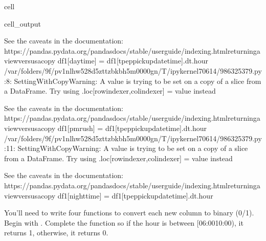 \documentclass[letterpaper,10pt,english]{sphinxmanual}
\begin{document}
\begin{sphinxuseclass}{cell}
\begin{sphinxuseclass}{cell_output}
\begin{sphinxVerbatim}[commandchars=\\\{\}]
See the caveats in the documentation: https://pandas.pydata.org/pandas\PYGZhy{}docs/stable/user\PYGZus{}guide/indexing.html\PYGZsh{}returning\PYGZhy{}a\PYGZhy{}view\PYGZhy{}versus\PYGZhy{}a\PYGZhy{}copy
  df1[\PYGZsq{}daytime\PYGZsq{}] = df1[\PYGZsq{}tpep\PYGZus{}pickup\PYGZus{}datetime\PYGZsq{}].dt.hour
/var/folders/9f/pv1nlhw528d\PYGZus{}5zttzbkb\PYGZus{}h5m0000gn/T/ipykernel\PYGZus{}70614/986325379.py:8: SettingWithCopyWarning: 
A value is trying to be set on a copy of a slice from a DataFrame.
Try using .loc[row\PYGZus{}indexer,col\PYGZus{}indexer] = value instead

See the caveats in the documentation: https://pandas.pydata.org/pandas\PYGZhy{}docs/stable/user\PYGZus{}guide/indexing.html\PYGZsh{}returning\PYGZhy{}a\PYGZhy{}view\PYGZhy{}versus\PYGZhy{}a\PYGZhy{}copy
  df1[\PYGZsq{}pm\PYGZus{}rush\PYGZsq{}] = df1[\PYGZsq{}tpep\PYGZus{}pickup\PYGZus{}datetime\PYGZsq{}].dt.hour
/var/folders/9f/pv1nlhw528d\PYGZus{}5zttzbkb\PYGZus{}h5m0000gn/T/ipykernel\PYGZus{}70614/986325379.py:11: SettingWithCopyWarning: 
A value is trying to be set on a copy of a slice from a DataFrame.
Try using .loc[row\PYGZus{}indexer,col\PYGZus{}indexer] = value instead

See the caveats in the documentation: https://pandas.pydata.org/pandas\PYGZhy{}docs/stable/user\PYGZus{}guide/indexing.html\PYGZsh{}returning\PYGZhy{}a\PYGZhy{}view\PYGZhy{}versus\PYGZhy{}a\PYGZhy{}copy
  df1[\PYGZsq{}nighttime\PYGZsq{}] = df1[\PYGZsq{}tpep\PYGZus{}pickup\PYGZus{}datetime\PYGZsq{}].dt.hour
\end{sphinxVerbatim}

\end{sphinxuseclass}
\end{sphinxuseclass}
\sphinxAtStartPar
You’ll need to write four functions to convert each new column to binary (0/1). Begin with . Complete the function so if the hour is between {[}06:00\textendash{}10:00), it returns 1, otherwise, it returns 0.
\end{document}
